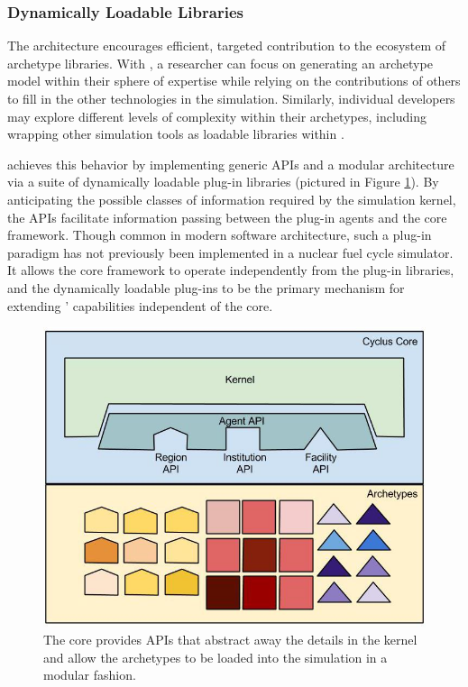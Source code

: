 \subsubsection{Dynamically Loadable Libraries}

The \Cyclus architecture encourages efficient, targeted contribution to the ecosystem of
archetype libraries.
With \Cyclus, a researcher can focus on generating an archetype model within their
sphere of expertise while relying on the contributions of others to fill
in the other technologies in the simulation.
Similarly, individual developers may explore different levels of complexity within their archetypes, including
wrapping other simulation tools as loadable libraries within \Cyclus.

\Cyclus achieves this behavior by implementing generic \glspl{API} and a
modular architecture via a suite of dynamically loadable plug-in libraries
(pictured in Figure \ref{fig:framework}). By anticipating the possible classes of
information required by the simulation kernel, the \Cyclus \glspl{API}
facilitate information passing between the plug-in agents and the core
framework.
Though common in modern software architecture, such a plug-in paradigm has not
previously been implemented in a nuclear fuel cycle simulator.
It allows the core \Cyclus framework to operate independently from the plug-in libraries, and the
dynamically loadable plug-ins to be the primary mechanism for extending \Cyclus'
capabilities independent of the core.

\begin{figure}[htbp!]
\begin{center}
\includegraphics[width=\textwidth]{./images/framework}
\end{center}
\caption{The \Cyclus core provides \glspl{API} that abstract away the details in
the kernel and allow the archetypes to be loaded into the simulation in a modular
fashion.}
\label{fig:framework}
\end{figure}


